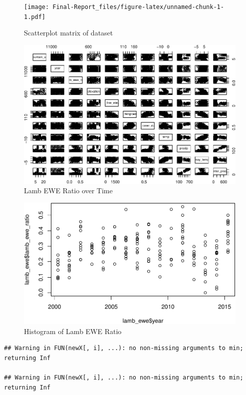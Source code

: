 \documentclass[
  12pt,
]{article}
\begin{document}
\begin{figure}
\centering
\texttt{[image: Final-Report\_files/figure-latex/unnamed-chunk-1-1.pdf]}
\caption{Scatterplot matrix of dataset}
\end{figure}

\begin{figure}
\centering
\includegraphics{Final-Report_files/figure-latex/unnamed-chunk-2-1.pdf}
\caption{Lamb EWE Ratio over Time}
\end{figure}

\begin{figure}
\centering
\includegraphics{Final-Report_files/figure-latex/unnamed-chunk-3-1.pdf}
\caption{Histogram of Lamb EWE Ratio}
\end{figure}

\begin{verbatim}
## Warning in FUN(newX[, i], ...): no non-missing arguments to min; returning Inf

## Warning in FUN(newX[, i], ...): no non-missing arguments to min; returning Inf
\end{verbatim}
\end{document}

